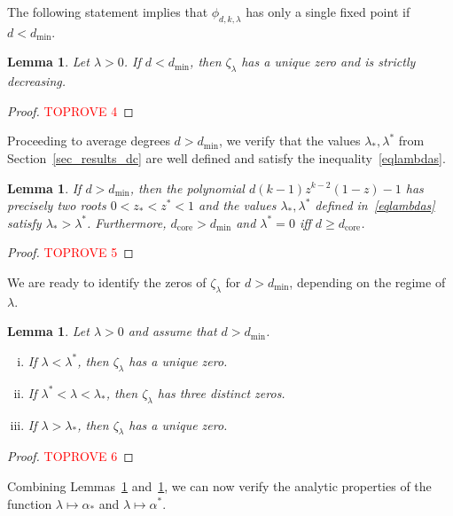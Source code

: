 \documentclass[10pt,reqno]{amsart}
\numberwithin{equation}{section}
\newcommand\dmin{d_{\mathrm{min}}}
\newcommand\dcore{d_{\mathrm{core}}}
\newcommand\Lem{Lemma}
\newcommand\Sec{Section}
\newtheorem{lemma}[definition]{Lemma}
\newcommand{\ph}{\phi_{d,k,\lambda}}
\newcommand{\zt}{\zeta_\lambda}
\begin{document}
The following statement implies that $\ph$ has only a single fixed point if $d<\dmin$.

\begin{lemma}\label{lem_belowdmin}
	Let $\lambda>0$.
	If $d<\dmin$, then $\zt$ has a unique zero and is strictly decreasing.
\end{lemma}
\begin{proof}\textcolor{red}{TOPROVE 4}\end{proof}

Proceeding to average degrees $d>\dmin$, we verify that the values $\lambda_*,\lambda^*$ from \Sec~\ref{sec_results_dc} are well defined and satisfy the inequality~\eqref{eqlambdas}.

\begin{lemma}\label{lem_abovedmin}
	If $d>\dmin$, then the polynomial $d(k-1)z^{k-2}(1-z)-1$ has precisely two roots $0<z_*<z^*<1$ and the values $\lambda_*,\lambda^*$ defined in~\eqref{eqlambdas} satisfy $\lambda_*>\lambda^*$.
	Furthermore, $\dcore>\dmin$ and $\lambda^*=0$ iff $d\geq\dcore$.
\end{lemma}
\begin{proof}\textcolor{red}{TOPROVE 5}\end{proof}

We are ready to identify the zeros of $\zt$ for $d>\dmin$, depending on the regime of $\lambda$.

\begin{lemma}\label{lem_zero}
	Let $\lambda>0$ and assume that $d>\dmin$.
	\begin{enumerate}[(i)]
		\item If  $\lambda<\lambda^*$, then $\zt$ has a unique zero.
		\item If  $\lambda^*<\lambda<\lambda_*$, then $\zt$ has three distinct zeros.
		\item If  $\lambda>\lambda_*$, then $\zt$ has a unique zero.
	\end{enumerate}
\end{lemma}
\begin{proof}\textcolor{red}{TOPROVE 6}\end{proof}

Combining \Lem s~\ref{lem_abovedmin} and~\ref{lem_zero}, we can now verify the analytic properties of the function $\lambda\mapsto\alpha_*$ and $\lambda\mapsto\alpha^*$.
\end{document}

